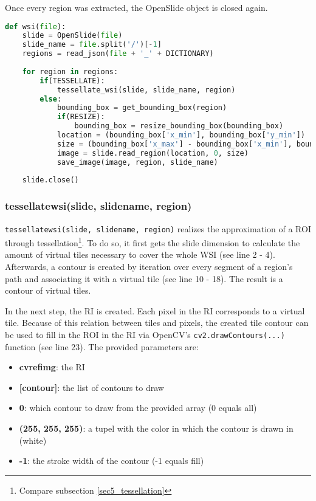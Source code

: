 Once every region was extracted, the OpenSlide object is closed again.

\begin{lstlisting}[frame=single,language=python]
def wsi(file):
	slide = OpenSlide(file)
	slide_name = file.split('/')[-1]
	regions = read_json(file + '_' + DICTIONARY)
	
	for region in regions:
		if(TESSELLATE):
			tessellate_wsi(slide, slide_name, region)
		else:
			bounding_box = get_bounding_box(region)
			if(RESIZE):
				bounding_box = resize_bounding_box(bounding_box)
			location = (bounding_box['x_min'], bounding_box['y_min'])
			size = (bounding_box['x_max'] - bounding_box['x_min'], bounding_box['y_max'] - bounding_box['y_min'])
			image = slide.read_region(location, 0, size)
			save_image(image, region, slide_name)
	
	slide.close()
\end{lstlisting}


\subsubsection{tessellate{\textunderscore}wsi(slide, slide{\textunderscore}name, region)}
\texttt{tessellate{\textunderscore}wsi(slide, slide{\textunderscore}name, region)} realizes the approximation of a ROI through tessellation\footnote{
	Compare subsection \ref{sec5_tessellation}
}. To do so, it first gets the slide dimension to calculate the amount of virtual tiles necessary to cover the whole WSI (see line 2 - 4). Afterwards, a contour is created by iteration over every segment of a region's path and associating it with a virtual tile (see line 10 - 18). The result is a contour of virtual tiles.

In the next step, the RI is created. Each pixel in the RI corresponds to a virtual tile. Because of this relation between tiles and pixels, the created tile contour can be used to fill in the ROI in the RI via OpenCV's \texttt{cv2.drawContours(...)} function (see line 23). The provided parameters are:
\begin{itemize}
	\item \textbf{cv{\textunderscore}ref{\textunderscore}img}: the RI
	\item \textbf{[contour]}: the list of contours to draw
	\item \textbf{0}: which contour to draw from the provided array (0 equals all)
	\item \textbf{(255, 255, 255)}: a tupel with the color in which the contour is drawn in (white)
	\item \textbf{-1}: the stroke width of the contour (-1 equals fill)
\end{itemize}

